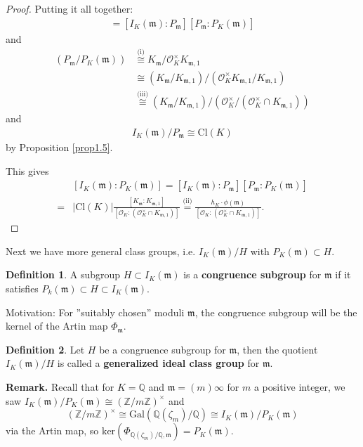 \documentclass{article}
\theoremstyle{definition}
\newtheorem{defn}{Definition}[section]
\begin{document}
\begin{proof}
    Putting it all together:
    \begin{align*}
        [I_K(\mathfrak{m}):P_K(\mathfrak{m})] = [I_K(\mathfrak{m}):P_{\mathfrak{m}}][P_{\mathfrak{m}}:P_K(\mathfrak{m})]
    \end{align*}
    and \begin{align*}
        (P_\mathfrak{m}/P_K(\mathfrak{m})) &\stackrel{\text{(i)}}{\cong}  K_{\mathfrak{m}}/\mathcal{O}_K^\times K_{\mathfrak{m},1} \\
        &\cong (K_{\mathfrak{m}}/K_{\mathfrak{m},1})/(\mathcal{O}_K^\times K_{\mathfrak{m},1}/K_{\mathfrak{m},1}) \\
        &\stackrel{\text{(iii)}}{\cong}  (K_{\mathfrak{m}}/K_{\mathfrak{m},1})/(\mathcal{O}_K^\times/(\mathcal{O}_K^\times \cap K_{\mathfrak{m},1}))
    \end{align*}
    and \begin{align*}
        I_K(\mathfrak{m})/P_\mathfrak{m} \cong \text{Cl}(K)
    \end{align*}
    by Proposition \ref{prop1.5}.
    \vspace{1mm}
     
    This gives 
    \begin{align*}
        &[I_K(\mathfrak{m}) : P_K(\mathfrak{m})] = [I_K(\mathfrak{m}) : P_{\mathfrak{m}}][P_\mathfrak{m} : P_K(\mathfrak{m})] \\
        =& |\text{Cl}(K)| \frac{[K_{\mathfrak{m}}:K_{\mathfrak{m},1}]}{[\mathcal{O}_K: (\mathcal{O}_K^\times \cap K_{\mathfrak{m},1})]} \stackrel{\text{(ii)}}{=}  \frac{h_K \cdot \phi(\mathfrak{\mathfrak{m}})}{[\mathcal{O}_K : (\mathcal{O}_K^\times \cap K_{\mathfrak{m},1})]}.
    \end{align*}
\end{proof}
Next we have more general class groups, i.e. $I_K(\mathfrak{m})/H$ with $P_K(\mathfrak{m}) \subset H$.
\begin{defn}
    A subgroup $H \subset I_K(\mathfrak{m})$ is a \textbf{congruence subgroup} for $\mathfrak{m}$ if it satisfies $P_k(\mathfrak{m}) \subset  H \subset I_K(\mathfrak{m})$.
\end{defn}
Motivation: For ''suitably chosen'' moduli $\mathfrak{m}$, the congruence subgroup will be the kernel of the Artin map $\Phi_{\mathfrak{m}}$.

\begin{defn}
    Let $H$ be a congruence subgroup for $\mathfrak{m}$, then the quotient $I_K(\mathfrak{m})/H$ is called a \textbf{generalized ideal class group} for $\mathfrak{m}$.
\end{defn}
\textbf{Remark.} Recall that for $K=\mathbb{Q}$ and $\mathfrak{m}=(m)\infty$ for $m$ a positive integer, we saw $I_K(\mathfrak{m})/P_K(\mathfrak{m}) \cong (\mathbb{Z}/m\mathbb{Z})^\times$ and \[
(\mathbb{Z}/m\mathbb{Z})^\times \cong \text{Gal}(\mathbb{Q}(\zeta_m)/\mathbb{Q}) \cong I_K(\mathfrak{m})/P_K(\mathfrak{m})
\]
via the Artin map, so $\text{ker}(\Phi_{\mathbb{Q}(\zeta_m)/\mathbb{Q},\mathfrak{m}}) = P_K(\mathfrak{m})$.
\vspace{1mm}
 
\end{document}
